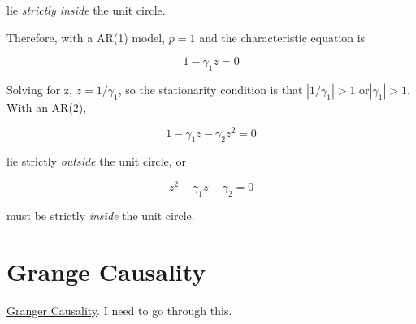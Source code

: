 \documentclass[12pt, a4paper, oneside]{article}\usepackage[]{graphicx}\usepackage[]{color}
\begin{document}
lie \emph{strictly inside} the unit circle.

Therefore, with a AR(1) model, $p = 1$ and the characteristic equation is 

\begin{equation}
1 - \gamma_1 z = 0
\end{equation}

Solving for z, $z = 1/\gamma_1$, so the stationarity condition is that $|1/\gamma_1 | > 1$ or$ |\gamma_1 | >1$.  With an AR(2), 

\begin{equation}
1 - \gamma_1 z - \gamma_2 z^2 =0
\end{equation}

lie strictly \emph{outside} the unit circle, or

\begin{equation}
z^2 - \gamma_1 z - \gamma_2 = 0
\end{equation}

must be strictly \emph{inside} the unit circle. 

\section{Grange Causality}
\href{http://davegiles.blogspot.ca/2011/04/testing-for-granger-causality.html}{Granger Causality}.  I need to go through this. 
\end{document}
